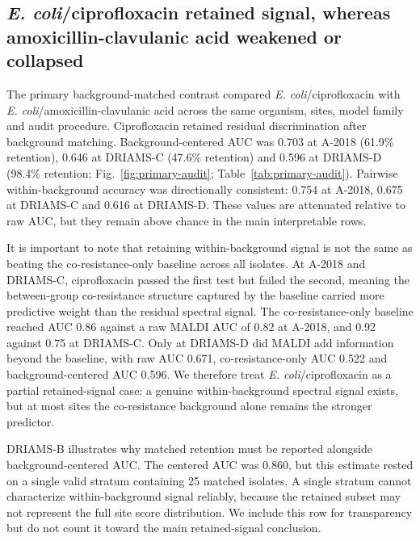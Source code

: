 \documentclass[11pt]{article}
\begin{document}
\subsection*{\textit{E. coli}/ciprofloxacin retained signal, whereas amoxicillin-clavulanic acid weakened or collapsed}

The primary background-matched contrast compared \textit{E. coli}/ciprofloxacin with \textit{E. coli}/amoxicillin-clavulanic acid across the same organism, sites, model family and audit procedure. Ciprofloxacin retained residual discrimination after background matching. Background-centered AUC was 0.703 at A-2018 (61.9\% retention), 0.646 at DRIAMS-C (47.6\% retention) and 0.596 at DRIAMS-D (98.4\% retention; Fig.~\ref{fig:primary-audit}; Table~\ref{tab:primary-audit}). Pairwise within-background accuracy was directionally consistent: 0.754 at A-2018, 0.675 at DRIAMS-C and 0.616 at DRIAMS-D. These values are attenuated relative to raw AUC, but they remain above chance in the main interpretable rows.

It is important to note that retaining within-background signal is not the same as beating the co-resistance-only baseline across all isolates. At A-2018 and DRIAMS-C, ciprofloxacin passed the first test but failed the second, meaning the between-group co-resistance structure captured by the baseline carried more predictive weight than the residual spectral signal. The co-resistance-only baseline reached AUC 0.86 against a raw MALDI AUC of 0.82 at A-2018, and 0.92 against 0.75 at DRIAMS-C. Only at DRIAMS-D did MALDI add information beyond the baseline, with raw AUC 0.671, co-resistance-only AUC 0.522 and background-centered AUC 0.596. We therefore treat \textit{E. coli}/ciprofloxacin as a partial retained-signal case: a genuine within-background spectral signal exists, but at most sites the co-resistance background alone remains the stronger predictor.

DRIAMS-B illustrates why matched retention must be reported alongside background-centered AUC. The centered AUC was 0.860, but this estimate rested on a single valid stratum containing 25 matched isolates. A single stratum cannot characterize within-background signal reliably, because the retained subset may not represent the full site score distribution. We include this row for transparency but do not count it toward the main retained-signal conclusion.
\end{document}
